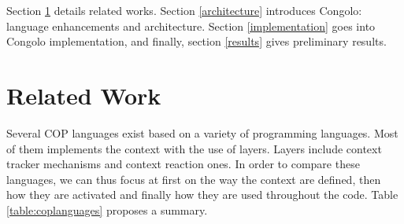 \documentclass{sig-alternate}
\begin{document}
Section \ref{related-work} details related works. Section \ref{architecture} introduces Congolo: language enhancements and architecture. Section \ref{implementation} goes into Congolo implementation, and finally, section \ref{results} gives preliminary results.  
\section{Related Work}
\label{related-work}

Several COP languages exist based on a variety of programming languages. Most of them implements the context with the use of layers. Layers include context tracker mechanisms and context reaction ones. In order to compare these languages, we can thus focus at first on the way the context are defined, then how they are activated and finally how they are used throughout the code. Table \ref{table:coplanguages} proposes a summary.
\end{document}
